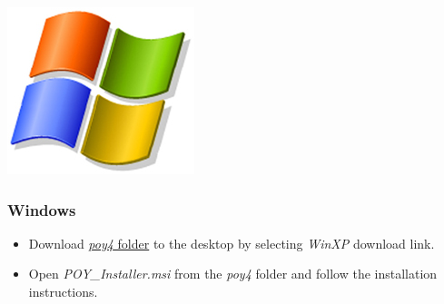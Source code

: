 \begin{flushleft}
	\begin{minipage}[c]{0.074\textwidth}
	   	\includegraphics[width=\textwidth]{figures/figlogowindows.jpg}
	\end{minipage}
	\quad
	\begin{minipage}[t]{0.88\textwidth}
		   	\subsubsection{Windows}
	\end{minipage}
		\begin{itemize}
			\item
                Download
                \href{http://research.amnh.org/scicomp/projects/poy.php}{\emph{poy4} folder} to the desktop by selecting \emph{WinXP} download link.

			\item 
                Open \emph{POY\_Installer.msi} from the \emph{poy4} folder and follow the installation instructions.
		\end{itemize}


\end{flushleft}
